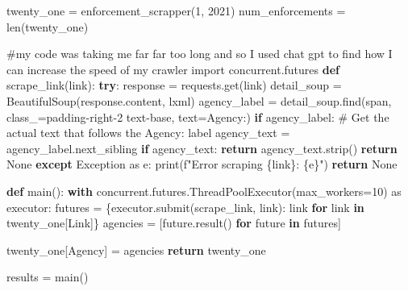 \documentclass[
  letterpaper,
  DIV=11,
  numbers=noendperiod]{scrartcl}
\newenvironment{Shaded}{\begin{snugshade}}{\end{snugshade}}
\newcommand{\BuiltInTok}[1]{\textcolor[rgb]{0.00,0.23,0.31}{#1}}
\newcommand{\CommentTok}[1]{\textcolor[rgb]{0.37,0.37,0.37}{#1}}
\newcommand{\ControlFlowTok}[1]{\textcolor[rgb]{0.00,0.23,0.31}{\textbf{#1}}}
\newcommand{\DecValTok}[1]{\textcolor[rgb]{0.68,0.00,0.00}{#1}}
\newcommand{\ImportTok}[1]{\textcolor[rgb]{0.00,0.46,0.62}{#1}}
\newcommand{\KeywordTok}[1]{\textcolor[rgb]{0.00,0.23,0.31}{\textbf{#1}}}
\newcommand{\NormalTok}[1]{\textcolor[rgb]{0.00,0.23,0.31}{#1}}
\newcommand{\OperatorTok}[1]{\textcolor[rgb]{0.37,0.37,0.37}{#1}}
\newcommand{\PreprocessorTok}[1]{\textcolor[rgb]{0.68,0.00,0.00}{#1}}
\newcommand{\SpecialCharTok}[1]{\textcolor[rgb]{0.37,0.37,0.37}{#1}}
\newcommand{\SpecialStringTok}[1]{\textcolor[rgb]{0.13,0.47,0.30}{#1}}
\newcommand{\StringTok}[1]{\textcolor[rgb]{0.13,0.47,0.30}{#1}}
\newcommand{\VariableTok}[1]{\textcolor[rgb]{0.07,0.07,0.07}{#1}}
\begin{document}
\begin{Shaded}
\begin{Highlighting}[]
\NormalTok{twenty\_one }\OperatorTok{=}\NormalTok{ enforcement\_scrapper(}\DecValTok{1}\NormalTok{, }\DecValTok{2021}\NormalTok{)}
\NormalTok{num\_enforcements }\OperatorTok{=} \BuiltInTok{len}\NormalTok{(twenty\_one)}
\end{Highlighting}
\end{Shaded}

\begin{Shaded}
\begin{Highlighting}[]
\CommentTok{\#my code was taking me far far too long and so I used chat gpt to find how I can increase the speed of my crawler}
\ImportTok{import}\NormalTok{ concurrent.futures}
\KeywordTok{def}\NormalTok{ scrape\_link(link):}
    \ControlFlowTok{try}\NormalTok{:}
\NormalTok{        response }\OperatorTok{=}\NormalTok{ requests.get(link)}
\NormalTok{        detail\_soup }\OperatorTok{=}\NormalTok{ BeautifulSoup(response.content, }\StringTok{\textquotesingle{}lxml\textquotesingle{}}\NormalTok{)}
\NormalTok{        agency\_label }\OperatorTok{=}\NormalTok{ detail\_soup.find(}\StringTok{\textquotesingle{}span\textquotesingle{}}\NormalTok{, class\_}\OperatorTok{=}\StringTok{\textquotesingle{}padding{-}right{-}2 text{-}base\textquotesingle{}}\NormalTok{, text}\OperatorTok{=}\StringTok{\textquotesingle{}Agency:\textquotesingle{}}\NormalTok{)}
        \ControlFlowTok{if}\NormalTok{ agency\_label:}
            \CommentTok{\# Get the actual text that follows the Agency: label}
\NormalTok{            agency\_text }\OperatorTok{=}\NormalTok{ agency\_label.next\_sibling}
            \ControlFlowTok{if}\NormalTok{ agency\_text:}
                \ControlFlowTok{return}\NormalTok{ agency\_text.strip()}
        \ControlFlowTok{return} \VariableTok{None}
    \ControlFlowTok{except} \PreprocessorTok{Exception} \ImportTok{as}\NormalTok{ e:}
        \BuiltInTok{print}\NormalTok{(}\SpecialStringTok{f"Error scraping }\SpecialCharTok{\{}\NormalTok{link}\SpecialCharTok{\}}\SpecialStringTok{: }\SpecialCharTok{\{}\NormalTok{e}\SpecialCharTok{\}}\SpecialStringTok{"}\NormalTok{)}
        \ControlFlowTok{return} \VariableTok{None}

\KeywordTok{def}\NormalTok{ main():}
    \ControlFlowTok{with}\NormalTok{ concurrent.futures.ThreadPoolExecutor(max\_workers}\OperatorTok{=}\DecValTok{10}\NormalTok{) }\ImportTok{as}\NormalTok{ executor:}
\NormalTok{        futures }\OperatorTok{=}\NormalTok{ \{executor.submit(scrape\_link, link): link }\ControlFlowTok{for}\NormalTok{ link }\KeywordTok{in}\NormalTok{ twenty\_one[}\StringTok{\textquotesingle{}Link\textquotesingle{}}\NormalTok{]\}}
\NormalTok{        agencies }\OperatorTok{=}\NormalTok{ [future.result() }\ControlFlowTok{for}\NormalTok{ future }\KeywordTok{in}\NormalTok{ futures]}

\NormalTok{    twenty\_one[}\StringTok{\textquotesingle{}Agency\textquotesingle{}}\NormalTok{] }\OperatorTok{=}\NormalTok{ agencies}
    \ControlFlowTok{return}\NormalTok{ twenty\_one}

\NormalTok{results }\OperatorTok{=}\NormalTok{ main()}
\end{Highlighting}
\end{Shaded}
\end{document}
